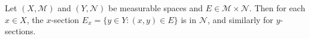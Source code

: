 Let $(X, \mathcal{M})$ and $(Y, \mathcal{N})$ be measurable spaces and $E \in \mathcal{M} \times \mathcal{N}$. Then for each $x \in X$, the $x$-section $E_x = \{y \in Y : (x, y) \in E\}$ is in $\mathcal{N}$, and similarly for $y$-sections.
